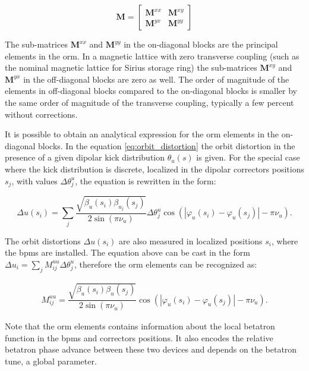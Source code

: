 \begin{equation}
    \mathbf{M} = \begin{bmatrix}
    \mathbf{M}^{xx} & \mathbf{M}^{xy} \\
    \mathbf{M}^{yx} & \mathbf{M}^{yy} 
\end{bmatrix}
\end{equation}

The sub-matrices $\mathbf{M}^{xx}$ and $\mathbf{M}^{yy}$ in the on-diagonal blocks are the principal elements in the \gls{orm}. In a magnetic lattice with zero transverse coupling (such as the nominal magnetic lattice for Sirius storage ring) the sub-matrices $\mathbf{M}^{xy}$ and $\mathbf{M}^{yx}$ in the off-diagonal blocks are zero as well. The order of magnitude of the elements in off-diagonal blocks compared to the on-diagonal blocks is smaller by the same order of magnitude of the transverse coupling, typically a few percent without corrections.

It is possible to obtain an analytical expression for the \gls{orm} elements in the on-diagonal blocks. In the equation \eqref{eq:orbit_distortion} the orbit distortion in the presence of a given dipolar kick distribution $\theta_u(s)$ is given. For the special case where the kick distribution is discrete, localized in the dipolar correctors positions $s_j$, with values $\Delta \theta^{u}_{j}$, the equation is rewritten in the form:

\begin{equation}
    \Delta u(s_i) = \sum_{j} \dfrac{\sqrt{\beta_{u}(s_i)\beta_{u_j}(s_j)}}{2\sin\left(\pi\nu_{u}\right)} \Delta \theta^{u}_j \cos\left( |\varphi_{u}(s_i) - \varphi_{u}(s_j)| - \pi\nu_{u} \right).
    \label{eq:discrete_orbit_distortion}
\end{equation}

The orbit distortions $\Delta u(s_i)$ are also measured in localized positions $s_i$, where the \gls{bpm}s are installed. The equation above can be cast in the form $\Delta u_i = \sum_{j} M_{ij}^{uu} \Delta \theta_{j}^{u}$, therefore the \gls{orm} elements can be recognized as:

\begin{align}
M_{ij}^{uu} = \dfrac{\sqrt{\beta_{u}(s_i)\beta_{u}(s_j)}}{2\sin\left(\pi\nu_{u}\right)}\cos\left( |\varphi_{u}(s_i) - \varphi_{u}(s_j)| - \pi\nu_{u} \right).
\label{eq:matrix_elements}
\end{align}

Note that the \gls{orm} elements contains information about the local betatron function in the \gls{bpm}s and correctors positions. It also encodes the relative betatron phase advance between these two devices and depends on the betatron tune, a global parameter. 

